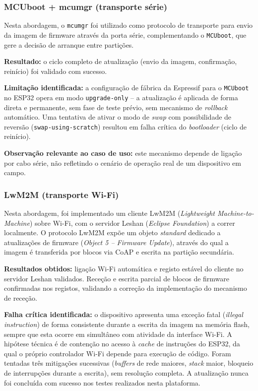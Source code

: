 \documentclass[a4paper,12pt]{article}
\begin{document}
\subsubsection{MCUboot + mcumgr (transporte série)}
Nesta abordagem, o \texttt{mcumgr} foi utilizado como protocolo de transporte para envio da imagem de firmware através da porta série, complementando o \texttt{MCUboot}, que gere a decisão de arranque entre partições.

\textbf{Resultado:} o ciclo completo de atualização (envio da imagem, confirmação, reinício) foi validado com sucesso.

\textbf{Limitação identificada:} a configuração de fábrica da Espressif para o \texttt{MCUboot} no ESP32 opera em modo \texttt{upgrade-only} -- a atualização é aplicada de forma direta e permanente, sem fase de teste prévio, sem mecanismo de \textit{rollback} automático. Uma tentativa de ativar o modo de \textit{swap} com possibilidade de reversão (\texttt{swap-using-scratch}) resultou em falha crítica do \textit{bootloader} (ciclo de reinício).

\textbf{Observação relevante ao caso de uso:} este mecanismo depende de ligação por cabo série, não refletindo o cenário de operação real de um dispositivo em campo.

\subsubsection{LwM2M (transporte Wi-Fi)}
Nesta abordagem, foi implementado um cliente LwM2M (\textit{Lightweight Machine-to-Machine}) sobre Wi-Fi, com o servidor Leshan (\textit{Eclipse Foundation}) a correr localmente. O protocolo LwM2M expõe um objeto \textit{standard} dedicado a atualizações de firmware (\textit{Object 5 -- Firmware Update}), através do qual a imagem é transferida por blocos via CoAP e escrita na partição secundária.

\textbf{Resultados obtidos:} ligação Wi-Fi automática e registo estável do cliente no servidor Leshan validados. Receção e escrita parcial de blocos de firmware confirmadas nos registos, validando a correção da implementação do mecanismo de receção.

\textbf{Falha crítica identificada:} o dispositivo apresenta uma exceção fatal (\textit{illegal instruction}) de forma consistente durante a escrita da imagem na memória flash, sempre que esta ocorre em simultâneo com atividade da interface Wi-Fi. A hipótese técnica é de contenção no acesso à \textit{cache} de instruções do ESP32, da qual o próprio controlador Wi-Fi depende para execução de código. Foram tentadas três mitigações sucessivas (\textit{buffers} de rede maiores, \textit{stack} maior, bloqueio de interrupções durante a escrita), sem resolução completa. A atualização nunca foi concluída com sucesso nos testes realizados nesta plataforma.
\end{document}
